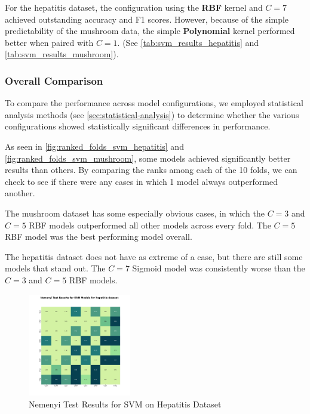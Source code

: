 For the hepatitis dataset, the configuration using the \textbf{RBF} kernel and $C=7$
achieved outstanding accuracy and F1 scores. However, because of the simple predictability
of the mushroom data, the simple \textbf{Polynomial} kernel performed better when paired with $C=1$.
(See \autoref{tab:svm_results_hepatitis} and \autoref{tab:svm_results_mushroom}).

\subsubsection*{Overall Comparison}

To compare the performance across model configurations, we employed statistical analysis methods
(see \autoref{sec:statistical-analysis}) to determine whether the various configurations showed
statistically significant differences in performance.

As seen in \autoref{fig:ranked_folds_svm_hepatitis} and \autoref{fig:ranked_folds_svm_mushroom},
some models achieved significantly better results than others. By comparing the ranks among each of the 10 folds,
we can check to see if there were any cases in which 1 model always outperformed another.

The mushroom dataset has some especially obvious cases, in which the $C=3$ and $C=5$ RBF models
outperformed all other models across every fold. The $C=5$ RBF model was the best performing model overall.

The hepatitis dataset does not have as extreme of a case, but there are still some models that stand out.
The $C=7$ Sigmoid model was consistently worse than the $C=3$ and $C=5$ RBF models.

\begin{figure}
    \centering
    \includegraphics[width=0.4\textwidth]{figures/nemenyi_test_results_SVM_hepatitis.png}
    \caption{Nemenyi Test Results for SVM on Hepatitis Dataset}
    \label{fig:nemenyi_test_results_SVM_hepatitis}
\end{figure}

